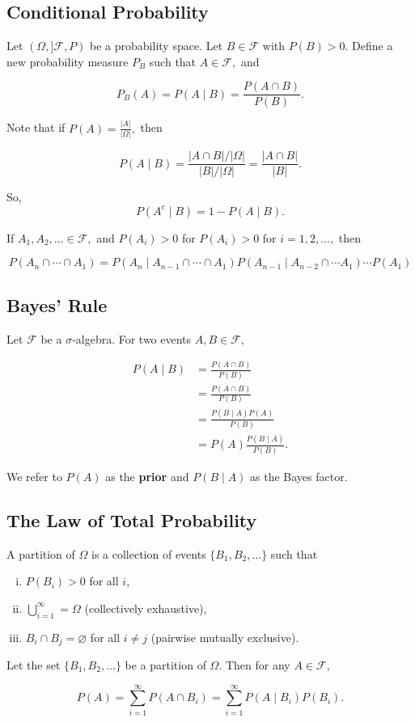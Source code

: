 \subsection{Conditional Probability}

Let $(\Omega, ]\mathcal F, P)$ be a probability space. Let $B\in \mathcal F$ with $P(B)>0.$ Define a new probability measure $P_B$ such that $A\in \mathcal F,$ and

$$
P_B(A)=P(A\mid B)=\frac{P(A\cap B)}{P(B)}.
$$

Note that if $P(A)=\frac{|A|}{|\Omega|},$ then 

$$P(A\mid B)=\frac{|A\cap B|/|\Omega|}{|B|/|\Omega|}=\frac{|A\cap B|}{|B|}.$$

So, 
$$
P(A^c\mid B)=1-P(A\mid B).
$$

If $A_1,A_2,\dots \in \mathcal F,$ and $P(A_i)>0$ for $P(A_i)>0$ for $i=1,2,\dots,$ then

$$
P(A_n\cap \cdots \cap A_1)=P(A_n\mid A_{n-1}\cap \cdots \cap A_1)P(A_{n-1}\mid A_{n-2} \cap \cdots A_1)\cdots P(A_1)
$$

\subsection{Bayes' Rule}

Let $\mathcal F$ be a $\sigma$-algebra. For two events $A,B\in\mathcal F$,

\begin{align*}
    P(A\mid B) &= \frac{P(A\cap B)}{P(B)} \\
    &=\frac{P(A\cap B)}{P(B)} \\
    &= \frac{P(B\mid A)P(A)}{P(B)} \\
    &= P(A)\frac{P(B\mid A)}{P(B)}.
\end{align*}

We refer to $P(A)$ as the \textbf{prior} and $P(B\mid A)$ as the Bayes factor.

\subsection{The Law of Total Probability}
\label{ssec:TLoTP}

\begin{definition}
A partition of $\Omega$ is a collection of events $\{B_1, B_2, \dots\}$ such that
\begin{enumerate}[i.]
    \item $P(B_i)>0$ for all $i$,
    \item $\bigcup^\infty_{i=1}=\Omega$ (collectively exhaustive),
    \item $B_i\cap B_j=\varnothing$ for all $i\neq j$ (pairwise mutually exclusive).
\end{enumerate}
\end{definition}
\begin{theorem}
Let the set $\{B_1,B_2,\dots\}$ be a partition of $\Omega.$ Then for any $A\in \mathcal F,$

$$P(A)=\sum^\infty_{i=1}P(A\cap B_i)=\sum^\infty_{i=1}P(A\mid B_i)P(B_i).$$
\end{theorem}
